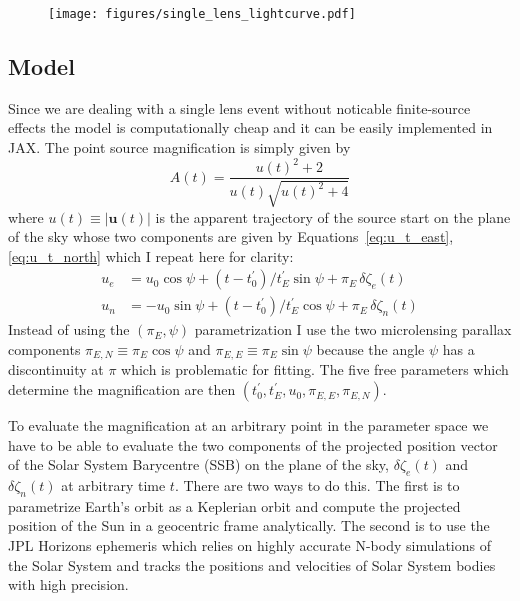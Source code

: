 \documentclass[12pt,dvipsnames]{report}
\newcommand{\ssf}[1]{\textsf{#1}}
\renewcommand{\vec}[1]{\boldsymbol{\mathbf{#1}}}
\begin{document}
\begin{figure}[!t]
    \begin{centering}
        \texttt{[image: figures/single\_lens\_lightcurve.pdf]}
        \caption{}
            \label{fig:ogle_lightcurve}
    \end{centering}
\end{figure}

\subsection{Model}
Since we are dealing with a single lens event without noticable finite-source effects
the model is computationally cheap and it can be easily implemented in \ssf{JAX}. The 
point source magnification is simply given by 
\begin{equation}
    A(t) = \frac{u(t)^2 + 2}{u(t)  \sqrt{u(t)^2 + 4}}
\end{equation}
where $u(t)\equiv |\vec u(t)|$ is the apparent trajectory of the source start on the plane 
of the sky whose two components are given by 
Equations~\ref{eq:u_t_east},\ref{eq:u_t_north} which I repeat here for clarity: 
\begin{align}
    u_e & =u_0\cos\psi + (t-t_0^\prime)/t_E^\prime\sin\psi + \pi_E\,\delta\zeta_e(t)  \\
    u_n & =-u_0\sin\psi + (t-t_0^\prime)/t_E^\prime\cos\psi + \pi_E\,\delta\zeta_n(t)
\end{align}
Instead of using the $(\pi_E, \psi)$ parametrization I use the two microlensing 
parallax components $\pi_{E,N}\equiv\pi_E\cos\psi$ and 
$\pi_{E,E}\equiv\pi_E\sin\psi$ because the angle $\psi$ has a discontinuity at $\pi$ 
which is problematic for fitting. The five free parameters which determine the 
magnification are then $(t_0^\prime, t_E^\prime, u_0, \pi_{E,E}, \pi_{E,N})$.

To evaluate the magnification at an arbitrary point in the parameter space we have 
to be able to evaluate the two components of the projected position vector of the 
Solar System Barycentre (SSB)
on the plane of the sky, $\delta\zeta_e(t)$ and $\delta\zeta_n(t)$ at arbitrary
time $t$. There are two ways to do this. The first is to parametrize Earth's orbit 
as a Keplerian orbit and compute the projected position of the Sun in a geocentric 
frame analytically. The second is to use the \ssf{JPL Horizons} ephemeris which 
relies on highly accurate N-body simulations of the Solar System and tracks the 
positions and velocities of Solar System bodies with high precision.
\end{document}
